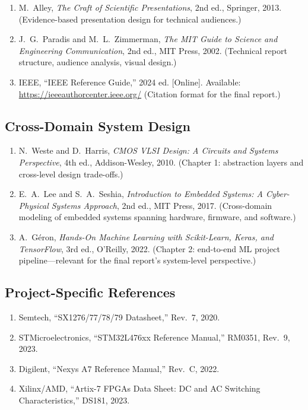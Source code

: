 \documentclass[11pt,letterpaper]{article}
\begin{document}
	\begin{enumerate}[leftmargin=2em]
		\item M.\ Alley, \textit{The Craft of Scientific Presentations}, 2nd ed., Springer, 2013. (Evidence-based presentation design for technical audiences.)
		\item J.\ G.\ Paradis and M.\ L.\ Zimmerman, \textit{The MIT Guide to Science and Engineering Communication}, 2nd ed., MIT Press, 2002. (Technical report structure, audience analysis, visual design.)
		\item IEEE, ``IEEE Reference Guide,'' 2024 ed. [Online]. Available: \url{https://ieeeauthorcenter.ieee.org/} (Citation format for the final report.)
	\end{enumerate}

	\subsection{Cross-Domain System Design}

	\begin{enumerate}[leftmargin=2em]
		\item N.\ Weste and D.\ Harris, \textit{CMOS VLSI Design: A Circuits and Systems Perspective}, 4th ed., Addison-Wesley, 2010. (Chapter 1: abstraction layers and cross-level design trade-offs.)
		\item E.\ A.\ Lee and S.\ A.\ Seshia, \textit{Introduction to Embedded Systems: A Cyber-Physical Systems Approach}, 2nd ed., MIT Press, 2017. (Cross-domain modeling of embedded systems spanning hardware, firmware, and software.)
		\item A.\ G\'eron, \textit{Hands-On Machine Learning with Scikit-Learn, Keras, and TensorFlow}, 3rd ed., O'Reilly, 2022. (Chapter 2: end-to-end ML project pipeline---relevant for the final report's system-level perspective.)
	\end{enumerate}

	\subsection{Project-Specific References}

	\begin{enumerate}[leftmargin=2em]
		\item Semtech, ``SX1276/77/78/79 Datasheet,'' Rev.\ 7, 2020.
		\item STMicroelectronics, ``STM32L476xx Reference Manual,'' RM0351, Rev.\ 9, 2023.
		\item Digilent, ``Nexys A7 Reference Manual,'' Rev.\ C, 2022.
		\item Xilinx/AMD, ``Artix-7 FPGAs Data Sheet: DC and AC Switching Characteristics,'' DS181, 2023.
	\end{enumerate}
\end{document}
